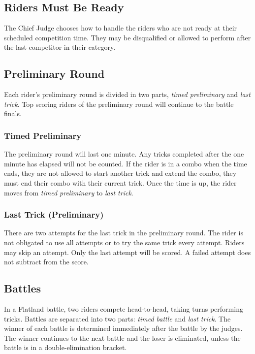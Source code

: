 \subsection{Riders Must Be Ready}
The Chief Judge chooses how to handle the riders who are not ready at their scheduled competition time.
They may be disqualified or allowed to perform after the last competitor in their category.

\subsection{Preliminary Round}
Each rider's preliminary round is divided in two parts, \textit{timed preliminary} and \textit{last trick}.
Top scoring riders of the preliminary round will continue to the battle finals.

\subsubsection{Timed Preliminary}
The preliminary round will last one minute.
Any tricks completed after the one minute has elapsed will not be counted.
If the rider is in a combo when the time ends, they are not allowed to start another trick and extend the combo, they must end their combo with their current trick.
Once the time is up, the rider moves from \textit{timed preliminary} to \textit{last trick}.

\subsubsection{Last Trick (Preliminary)}
There are two attempts for the last trick in the preliminary round.
The rider is not obligated to use all attempts or to try the same trick every attempt.
Riders may skip an attempt.
Only the last attempt will be scored.
A failed attempt does not subtract from the score.

\subsection{Battles}
In a Flatland battle, two riders compete head-to-head, taking turns performing tricks.
Battles are separated into two parts: \textit{timed battle} and \textit{last trick}.
The winner of each battle is determined immediately after the battle by the judges.
The winner continues to the next battle and the loser is eliminated, unless the battle is in a double-elimination bracket.

